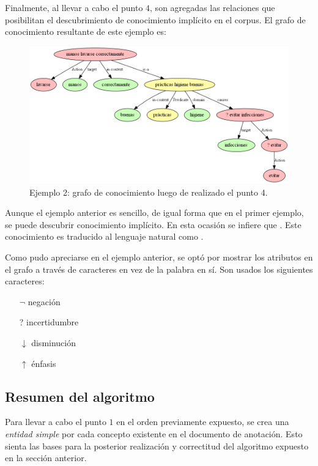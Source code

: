 Finalmente, al llevar a cabo el punto $4$, son agregadas las relaciones que posibilitan el descubrimiento de conocimiento implícito en el corpus. El grafo de conocimiento resultante de este ejemplo es:
\begin{figure}[H]
	\begin{center}
		\includegraphics[width=\textwidth]{graphics/knowledge_graph_example2_4.png}
		\caption[Ejemplo 2: grafo de conocimiento luego de realizado el punto 4]{Ejemplo 2: grafo de conocimiento luego de realizado el punto 4.}
		\label{fig:knowledge_graph2.4}
	\end{center}
\end{figure}

Aunque el ejemplo anterior es sencillo, de igual forma que en el primer ejemplo, se puede descubrir conocimiento implícito. En esta ocasión se infiere que . Este conocimiento es traducido al lenguaje natural como .

Como pudo apreciarse en el ejemplo anterior, se optó por mostrar los atributos en el grafo a través de caracteres en vez de la palabra en sí. Son usados los siguientes caracteres:
\begin{itemize}
	\item[$\lnot$] negación
	\item[?] incertidumbre
	\item[$\downarrow$] disminución
	\item[$\uparrow$] énfasis
\end{itemize}

\subsection{Resumen del algoritmo}\label{section:ontology_construction}
Para llevar a cabo el punto $1$ en el orden previamente expuesto, se crea una \textit{entidad simple} por cada concepto existente en el documento de anotación. Esto sienta las bases para la posterior realización y correctitud del algoritmo expuesto en la sección anterior.

